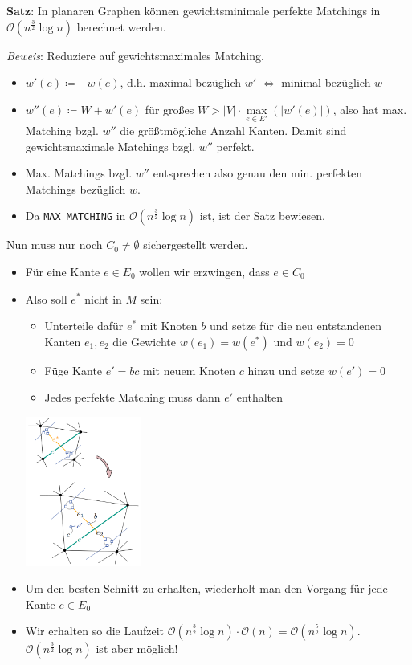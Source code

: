 \textbf{Satz}: In planaren Graphen können gewichtsminimale perfekte Matchings in $\mathcal{O}(n^\frac{3}{2}\log n)$ berechnet werden.

\textit{Beweis}: Reduziere auf gewichtsmaximales Matching.
\begin{itemize}
	\item $w'(e)\coloneqq -w(e)$, d.h. maximal bezüglich $w'$ $\iff$ minimal bezüglich $w$
	\item $w''(e)\coloneqq W+w'(e)$ für großes $W>|V|\cdot\max\limits_{e\in E'} (|w'(e)|)$, also hat max. Matching bzgl. $w''$ die größtmögliche Anzahl Kanten. Damit sind gewichtsmaximale Matchings bzgl. $w''$ perfekt.
	\item Max. Matchings bzgl. $w''$ entsprechen also genau den min. perfekten Matchings bezüglich $w$.
	\item Da \texttt{MAX MATCHING} in $\mathcal{O}(n^\frac{3}{2}\log n)$ ist, ist der Satz bewiesen.
\end{itemize}
\bigskip
Nun muss nur noch $C_0\neq\emptyset$ sichergestellt werden.
\begin{itemize}
	\item Für eine Kante $e\in E_0$ wollen wir erzwingen, dass $e\in C_0$
	\item Also soll $e^*$ nicht in $M$ sein:
	\begin{itemize}
		\item Unterteile dafür $e^*$ mit Knoten $b$ und setze für die neu entstandenen Kanten $e_1,e_2$ die Gewichte $w(e_1)=w(e^*)$ und $w(e_2)=0$
		\item Füge Kante $e'=bc$ mit neuem Knoten $c$ hinzu und setze $w(e')=0$
		\item Jedes perfekte Matching muss dann $e'$ enthalten
	\end{itemize}
	\begin{center}
		\includegraphics[width=0.3\textwidth]{images/mmc-8.png}
	\end{center}
	\item Um den besten Schnitt zu erhalten, wiederholt man den Vorgang für jede Kante $e\in E_0$
	\item Wir erhalten so die Laufzeit $\mathcal{O}(n^\frac{3}{2}\log n)\cdot\mathcal{O}(n)=\mathcal{O}(n^\frac{5}{2}\log n)$. $\mathcal{O}(n^\frac{3}{2}\log n)$ ist aber möglich!
\end{itemize}


